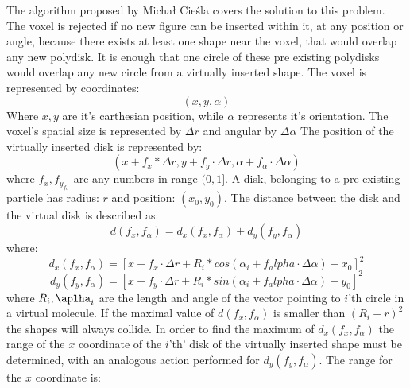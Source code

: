 \documentclass[12pt, oneside]{report}
\begin{document}
The algorithm proposed by Michał Cieśla covers the solution to this problem.\autocite[1]{ciesla} \newline
The voxel is rejected if no new figure can be inserted within it, at any position or angle, because there exists at least one shape near the voxel, that would overlap any new polydisk. It is enough that one circle of these pre existing polydisks would overlap any new circle from a virtually inserted shape.
The voxel is represented by coordinates:
\begin{equation*}
(x,y,\alpha)
\end{equation*}
Where $x,y$ are it's carthesian position, while $\alpha$ represents it's orientation. \newline
The voxel's spatial size is represented by $\Delta r$ and angular by $\Delta \alpha$ \newline
The position of the virtually inserted disk is represented by:
\begin{equation*}
(x+f_x*\Delta r, y + f_y \cdot \Delta r, \alpha + f_{\alpha} \cdot \Delta \alpha)
\end{equation*}
where $f_x,f_y_f_{\alpha}$ are any numbers in range $(0,1]$. \newline
A disk, belonging to a pre-existing particle has radius: $r$ and position: $(x_0,y_0)$. The distance between the disk and the virtual disk is described as: \newline
\begin{equation*}
d(f_x,f_{\alpha})=d_x(f_x,f_{\alpha})+d_y(f_y,f_{\alpha})
\end{equation*}
where: \newline
\begin{equation*}
d_x(f_x,f_{\alpha})=[x+f_x \cdot \Delta r + R_i * cos(\alpha_i+f_alpha \cdot \Delta \alpha)-x_0]^2
\end{equation*}
\begin{equation*}
d_y(f_y,f_{\alpha})=[x+f_y \cdot \Delta r + R_i * sin(\alpha_i+f_alpha \cdot \Delta \alpha)-y_0]^2
\end{equation*}
where $R_i, \aplha_i$ are the length and angle of the vector pointing to $i$'th circle in a virtual molecule. \newline
If the maximal value of $d(f_x,f_{\alpha})$ is smaller than $(R_i + r)^2$ the shapes will always collide. \newline
In order to find the maximum of $d_x(f_x,f_{\alpha})$ the range of the $x$ coordinate of the $i$'th' disk of the virtually inserted shape must be determined, with an analogous action performed for $d_y(f_y,f_{\alpha})$. The range for the $x$ coordinate is:
\end{document}
